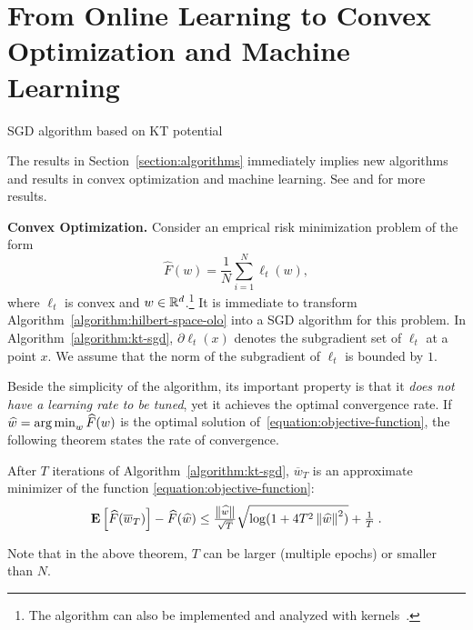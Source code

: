 \section{From Online Learning to Convex Optimization and Machine Learning}
\label{section:applications}

\begin{algorithm}[t]
\caption{SGD algorithm based on KT potential \label{algorithm:kt-sgd}}
\begin{algorithmic}[1]
{
\ENDFOR
{}
}
\end{algorithmic}
\end{algorithm}

The results in Section~\ref{section:algorithms} immediately implies new algorithms and
results in convex optimization and machine learning. See \cite{Orabona-2014}
and \cite{Luo-Schapire-2015} for more results.

\textbf{Convex Optimization.} 
Consider an emprical risk minimization problem of the form
%
\begin{equation}
\label{equation:objective-function}
\widehat{F}(w) = \frac{1}{N} \sum_{i=1}^N \ell_t(w),
\end{equation}
%
where $\ell_t$ is convex and $w \in \mathbb{R}^d$.\footnote{The algorithm can also be
implemented and analyzed with kernels~\citep{Orabona-2014}.} It is immediate to
transform Algorithm~\ref{algorithm:hilbert-space-olo} into a \ac{SGD} algorithm
for this problem. In Algorithm~\ref{algorithm:kt-sgd}, $\partial\ell_t(x)$
denotes the subgradient set of $\ell_t$ at a point $x$.  We assume that the
norm of the subgradient of $\ell_t$ is bounded by $1$.

Beside the simplicity of the algorithm, its important property is that it
\emph{does not have a learning rate to be tuned}, yet it achieves the optimal
convergence rate. If $\widehat{w} = \operatorname*{arg\,min}_w \widehat{F}(w)$ is the optimal
solution of~\eqref{equation:objective-function}, the following theorem states
the rate of convergence.
%
\begin{theorem}
After $T$ iterations of Algorithm~\ref{algorithm:kt-sgd}, $\overline{w}_T$ is
an approximate minimizer of the function \eqref{equation:objective-function}:
\[
\operatorname*{\mathbf{E}}\left[\widehat{F}(\overline{w}_T)\right] - \widehat{F}(\widehat{w}) \leq \tfrac{\left\|{\widehat{w}}\right\|}{\sqrt{T}} \sqrt{\log(1+4 T^2 \left\|{\widehat{w}}\right\|^2)} +\tfrac{1}{T} \; .
\]
\end{theorem}
%
Note that in the above theorem, $T$ can be larger (multiple epochs) or smaller
than $N$.


